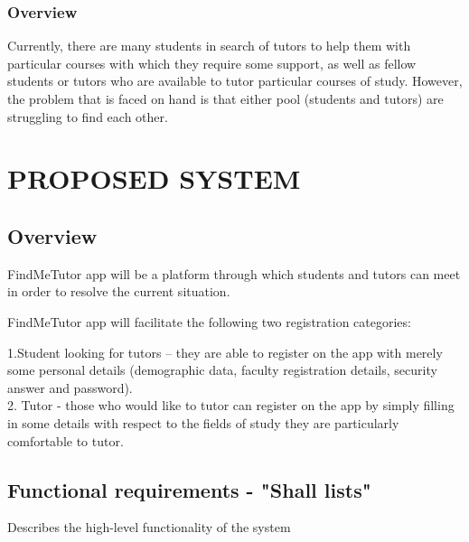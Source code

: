 \documentclass[12pt]{article}
\begin{document}
\subsubsection{Overview}
\begin{flushleft}
Currently, there are many students in search of tutors to help them with particular courses with which they require some support, as well as fellow students or tutors who are available to tutor particular courses of study. However, the problem that is faced on hand is that either pool (students and tutors) are struggling to find each other. 
\end{flushleft}

\section{PROPOSED SYSTEM}
\subsection{Overview}
\begin{flushleft}
FindMeTutor app will be a platform through which students and tutors can meet in order to resolve the current situation. 
\end{flushleft}
\begin{flushleft}
FindMeTutor app will facilitate the following two registration categories: 

\begin{flushleft}
1.Student looking for tutors – they are able to  register on the app with merely some personal details (demographic data, faculty registration details, security answer and password).\\
2. Tutor - those who would like to tutor can register on the app by simply filling in some details with respect to the fields of study they are particularly comfortable to tutor.\\
\end{flushleft}
\end{flushleft}
\subsection{Functional requirements - "Shall lists"}

Describes the high-level functionality of the system\\
\end{document}
